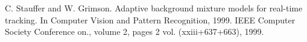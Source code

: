 \begin{thebibliography}{9}

C. Stauffer and W. Grimson. Adaptive background mixture
models for real-time tracking. In Computer Vision and Pattern Recognition, 1999. IEEE Computer Society Conference on., volume 2, pages 2 vol. (xxiii+637+663), 1999.
 

\end{thebibliography}